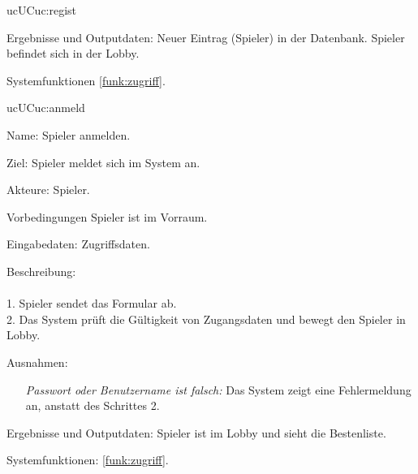 \begin{description}[leftmargin=5em, style=sameline]
\begin{lhp}{uc}{UC}{uc:regist}
\begin{itemize}
			\end{itemize}
		\item [Ergebnisse und Outputdaten:] Neuer Eintrag (Spieler) in der Datenbank. Spieler befindet sich in der Lobby.
		\item [Systemfunktionen] \ref{funk:zugriff}.
	\end{lhp}
	
	\begin{lhp}{uc}{UC}{uc:anmeld}
		\item [Name:] Spieler anmelden.
		\item [Ziel:] Spieler meldet sich im System an.
		\item [Akteure:] Spieler.
		\item [Vorbedingungen] Spieler ist im Vorraum.
		\item [Eingabedaten:] Zugriffsdaten.
		\item [Beschreibung:] \hfill\\ \hfill\\
			1. Spieler sendet das Formular ab.\\
			2. Das System prüft die Gültigkeit von Zugangsdaten und bewegt den Spieler in Lobby.\\				
		\item [Ausnahmen:] \hfill
			\begin{itemize} 
				\item[] \textit{Passwort oder Benutzername ist falsch:} Das System zeigt eine Fehlermeldung an, anstatt des Schrittes 2.
				
			\end{itemize}
		\item [Ergebnisse und Outputdaten:] Spieler ist im Lobby und sieht die Bestenliste.	
		\item [Systemfunktionen:] \ref{funk:zugriff}.
	\end{lhp}
	

\end{description}
